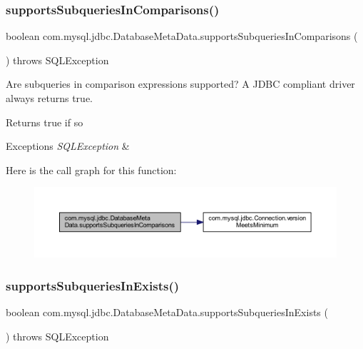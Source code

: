 \subsubsection{\texorpdfstring{supports\+Subqueries\+In\+Comparisons()}{supportsSubqueriesInComparisons()}}
{\footnotesize\ttfamily boolean com.\+mysql.\+jdbc.\+Database\+Meta\+Data.\+supports\+Subqueries\+In\+Comparisons (\begin{DoxyParamCaption}{ }\end{DoxyParamCaption}) throws S\+Q\+L\+Exception}

Are subqueries in comparison expressions supported? A J\+D\+BC compliant driver always returns true.

\begin{DoxyReturn}{Returns}
true if so 
\end{DoxyReturn}

\begin{DoxyExceptions}{Exceptions}
{\em S\+Q\+L\+Exception} & \\
\hline
\end{DoxyExceptions}
Here is the call graph for this function\+:
\nopagebreak
\begin{figure}[H]
\begin{center}
\leavevmode
\includegraphics[width=350pt]{classcom_1_1mysql_1_1jdbc_1_1_database_meta_data_abc16823d166bde51aac59efa7ada257e_cgraph}
\end{center}
\end{figure}
\mbox{\label{classcom_1_1mysql_1_1jdbc_1_1_database_meta_data_a211baae4eb6447aa3a4c7b15190ebce4}} 
\subsubsection{\texorpdfstring{supports\+Subqueries\+In\+Exists()}{supportsSubqueriesInExists()}}
{\footnotesize\ttfamily boolean com.\+mysql.\+jdbc.\+Database\+Meta\+Data.\+supports\+Subqueries\+In\+Exists (\begin{DoxyParamCaption}{ }\end{DoxyParamCaption}) throws S\+Q\+L\+Exception}

